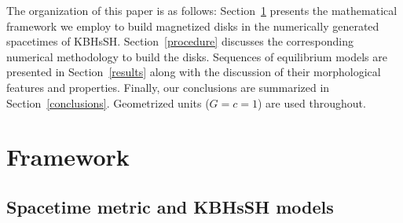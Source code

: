\documentclass[twocolumn,aps,showpacs,showkeys,prd,superscriptaddress,byrevtex, amsmath]{revtex4-1}
\begin{document}

The organization of this paper is as follows: Section~\ref{framework} presents  the mathematical framework we employ to build magnetized disks in the numerically generated spacetimes of KBHsSH. Section~\ref{procedure} discusses the corresponding numerical methodology to build the disks. Sequences of equilibrium models are presented in Section~\ref{results} along with the discussion of their morphological features and properties. Finally, our conclusions  are  summarized  in  Section~\ref{conclusions}. Geometrized units ($G=c=1$) are used throughout. 
 
\section{Framework}
\label{framework}

\subsection{Spacetime metric and KBHsSH models}
\end{document}
